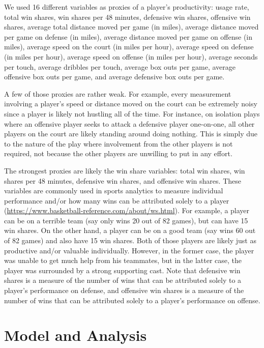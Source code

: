 \documentclass[12pt]{article}
\begin{document}
	We used 16 different variables as proxies of a player's productivity: usage rate, total win shares, win shares per 48 minutes, defensive win shares, offensive win shares, average total distance moved per game (in miles), average distance moved per game on defense (in miles), average distance moved per game on offense (in miles), average speed on the court (in miles per hour), average speed on defense (in miles per hour), average speed on offense (in miles per hour), average seconds per touch, average dribbles per touch, average box outs per game, average offensive box outs per game, and average defensive box outs per game. 
	
	A few of those proxies are rather weak. For example, every measurement involving a player's speed or distance moved on the court can be extremely noisy since a player is likely not hustling all of the time. For instance, on isolation plays where an offensive player seeks to attack a defensive player one-on-one, all other players on the court are likely standing around doing nothing. This is simply due to the nature of the play where involvement from the other players is not required, not because the other players are unwilling to put in any effort. 
	
	The strongest proxies are likely the win share variables: total win shares, win shares per 48 minutes, defensive win shares, and offensive win shares. These variables are commonly used in sports analytics to measure individual performance and/or how many wins can be attributed solely to a player (\url{https://www.basketball-reference.com/about/ws.html}). For example, a player can be on a terrible team (say only wins 20 out of 82 games), but can have 15 win shares. On the other hand, a player can be on a good team (say wins 60 out of 82 games) and also have 15 win shares. Both of those players are likely just as productive and/or valuable individually. However, in the former case, the player was unable to get much help from his teammates, but in the latter case, the player was surrounded by a strong supporting cast. Note that defensive win shares is a measure of the number of wins that can be attributed solely to a player's performance on defense, and offensive win shares is a measure of the number of wins that can be attributed solely to a player's performance on offense. 
	
	\section{Model and Analysis}
	
\end{document}
